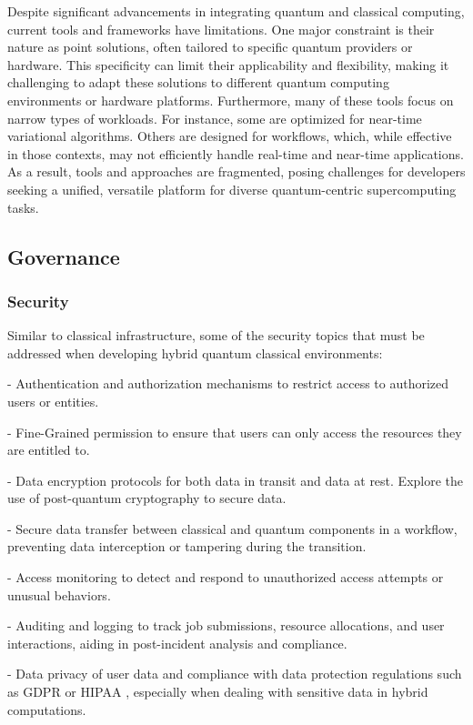 Despite significant advancements in integrating quantum and classical computing, current tools and frameworks have limitations. One major constraint is their nature as point solutions, often tailored to specific quantum providers or hardware. This specificity can limit their applicability and flexibility, making it challenging to adapt these solutions to different quantum computing environments or hardware platforms. Furthermore, many of these tools focus on narrow types of workloads. For instance, some are optimized for near-time variational algorithms. Others are designed for workflows, which, while effective in those contexts, may not efficiently handle real-time and near-time applications. As a result, tools and approaches are fragmented, posing challenges for developers seeking a unified, versatile platform for diverse quantum-centric supercomputing tasks.


\subsection{Governance}
\label{sec:queuing:gov}

\subsubsection{Security}

Similar to classical infrastructure, some of the security topics that must be addressed when developing hybrid quantum classical environments:

- Authentication and authorization mechanisms to restrict access to authorized users or entities.

- Fine-Grained permission to ensure that users can only access the resources they are entitled to.

- Data encryption protocols for both data in transit and data at rest. Explore the use of post-quantum cryptography to secure data.

- Secure data transfer between classical and quantum components in a workflow, preventing data interception or tampering during the transition.

- Access monitoring to detect and respond to unauthorized access attempts or unusual behaviors.

- Auditing and logging to track job submissions, resource allocations, and user interactions, aiding in post-incident analysis and compliance.

- Data privacy of user data and compliance with data protection regulations such as GDPR \cite{GDPR2016a} or HIPAA \cite{hipaa}, especially when dealing with sensitive data in hybrid computations.

